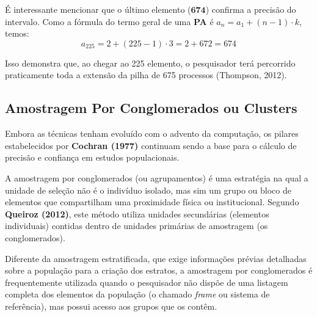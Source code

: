 É interessante mencionar que o último elemento ($\mathbf{674}$) confirma a precisão do intervalo. Como a fórmula do termo geral de uma \textbf{PA} é $a_n = a_1 + (n-1) \cdot k$, temos:$$a_{225} = 2 + (225-1) \cdot 3 = 2 + 672 = 674$$ 

Isso demonstra que, ao chegar ao 225 elemento, o pesquisador terá percorrido praticamente toda a extensão da pilha de 675 processos (Thompson, 2012).


\newpage

\subsection{Amostragem Por Conglomerados ou Clusters}

Embora as técnicas tenham evoluído com o advento da computação, os pilares estabelecidos por \textbf{Cochran (1977)} continuam sendo a base para o cálculo de precisão e confiança em estudos populacionais.
\vskip0.3cm

A amostragem por conglomerados (ou agrupamentos) é uma estratégia na qual a unidade de seleção não é o indivíduo isolado, mas sim um grupo ou bloco de elementos que compartilham uma proximidade física ou institucional. Segundo \textbf{Queiroz (2012)}, este método utiliza unidades secundárias (elementos individuais) contidas dentro de unidades primárias de amostragem (os conglomerados).
\vskip0.3cm

Diferente da amostragem estratificada, que exige informações prévias detalhadas sobre a população para a criação dos estratos, a amostragem por conglomerados é frequentemente utilizada quando o pesquisador não dispõe de uma listagem completa dos elementos da população (o chamado \textit{frame} ou sistema de referência), mas possui acesso aos grupos que os contêm.

